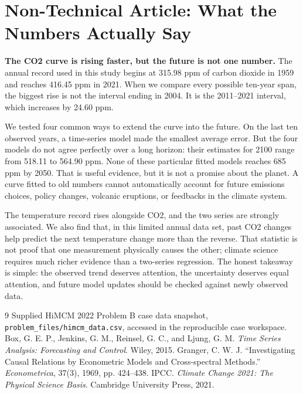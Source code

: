 \documentclass{mcmthesis}
\begin{document}
\section{Non-Technical Article: What the Numbers Actually Say}
\textbf{The CO2 curve is rising faster, but the future is not one number.} The annual record used in this study begins at 315.98 ppm of carbon dioxide in 1959 and reaches 416.45 ppm in 2021. When we compare every possible ten-year span, the biggest rise is not the interval ending in 2004. It is the 2011--2021 interval, which increases by 24.60 ppm.

We tested four common ways to extend the curve into the future. On the last ten observed years, a time-series model made the smallest average error. But the four models do not agree perfectly over a long horizon: their estimates for 2100 range from 518.11 to 564.90 ppm. None of these particular fitted models reaches 685 ppm by 2050. That is useful evidence, but it is not a promise about the planet. A curve fitted to old numbers cannot automatically account for future emissions choices, policy changes, volcanic eruptions, or feedbacks in the climate system.

The temperature record rises alongside CO2, and the two series are strongly associated. We also find that, in this limited annual data set, past CO2 changes help predict the next temperature change more than the reverse. That statistic is not proof that one measurement physically causes the other; climate science requires much richer evidence than a two-series regression. The honest takeaway is simple: the observed trend deserves attention, the uncertainty deserves equal attention, and future model updates should be checked against newly observed data.

\clearpage
\begin{thebibliography}{9}
 Supplied HiMCM 2022 Problem B case data snapshot, \texttt{problem\_files/himcm\_data.csv}, accessed in the reproducible case workspace.
 Box, G. E. P., Jenkins, G. M., Reinsel, G. C., and Ljung, G. M. \emph{Time Series Analysis: Forecasting and Control}. Wiley, 2015.
 Granger, C. W. J. ``Investigating Causal Relations by Econometric Models and Cross-spectral Methods.'' \emph{Econometrica}, 37(3), 1969, pp. 424--438.
 IPCC. \emph{Climate Change 2021: The Physical Science Basis}. Cambridge University Press, 2021.
\end{thebibliography}
\end{document}
